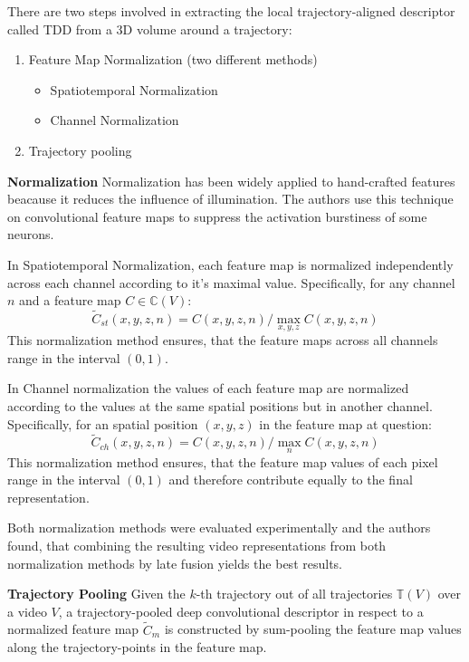 There are two steps involved in extracting the local trajectory-aligned descriptor called TDD from a 3D volume around a trajectory:
\begin{enumerate}
    \item Feature Map Normalization (two different methods)
        \begin{itemize}
            \item Spatiotemporal Normalization
            \item Channel Normalization
        \end{itemize}
    \item Trajectory pooling
\end{enumerate}

\textbf{Normalization}
Normalization has been widely applied to hand-crafted features beacause it reduces the influence of illumination.
The authors use this technique on convolutional feature maps to suppress the activation burstiness of some neurons.

In Spatiotemporal Normalization, each feature map is normalized independently across each channel according to it's maximal value.
Specifically, for any channel $n$ and a feature map $C \in \mathbb{C}(V)$:
\begin{equation*}
    \tilde{C}_{st}(x,y,z,n) = C(x,y,z,n) / \max_{x,y,z} C(x,y,z,n)
\end{equation*}
This normalization method ensures, that the feature maps across all channels range in the interval $(0,1)$.

In Channel normalization the values of each feature map are normalized according to the values at the same spatial positions but in another channel.
Specifically, for an spatial position $(x,y,z)$ in the feature map at question:
\begin{equation*}
    \tilde{C}_{ch}(x,y,z,n) = C(x,y,z,n) / \max_{n} C(x,y,z,n)
\end{equation*}
This normalization method ensures, that the feature map values of each pixel range in the interval $(0,1)$ and therefore contribute equally to the final representation.

Both normalization methods were evaluated experimentally and the authors found, that combining the resulting video representations from both normalization methods by late fusion yields the best results.

\textbf{Trajectory Pooling}
Given the $k$-th trajectory out of all trajectories $\mathbb{T}(V)$ over a video $V$, a trajectory-pooled deep convolutional descriptor in respect to a normalized feature map $\tilde{C}_m$ is constructed by sum-pooling the feature map values along the trajectory-points in the feature map.

